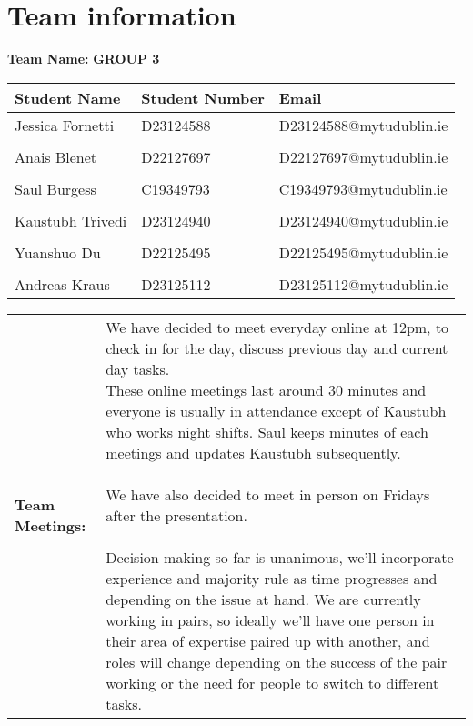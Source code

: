 \documentclass[a4paper,12pt]{article}
\begin{document}
\newpage
\section{Team information}
\textbf{Team Name:} \textbf{GROUP 3}
\vspace{0.2cm}
\begin{table}[h]
    \centering
    \begin{tabularx}{\textwidth}{@{}p{4cm} p{4cm} p{5cm}@{}}
        \toprule Student Name & Student Number & Email \\
        \midrule
            Jessica Fornetti & D23124588 & D23124588@mytudublin.ie \\ \\
            Anais Blenet & D22127697 & D22127697@mytudublin.ie \\ \\
            Saul Burgess & C19349793 & C19349793@mytudublin.ie \\ \\
            Kaustubh Trivedi & D23124940 & D23124940@mytudublin.ie \\ \\
            Yuanshuo Du & D22125495 & D22125495@mytudublin.ie \\ \\
            Andreas Kraus & D23125112 & D23125112@mytudublin.ie \\ 
        \bottomrule 
    \end{tabularx}
\end{table}

\begin{tabular}{|p{}|p{}|}
    \hline
    \textbf{Team Meetings:} & \parbox{0.65\textwidth}
    {\vspace{0.3cm}
    We have decided to meet everyday online at 12pm, to check in for the day, discuss previous day and current day tasks. \\ These online meetings last around 30 minutes and everyone is usually in attendance except of Kaustubh who works night shifts. Saul keeps minutes of each meetings and updates Kaustubh subsequently. \\ \\ We have also decided to meet in person on Fridays after the presentation. \\ \\ Decision-making so far is unanimous, we'll incorporate experience and majority rule as time progresses and depending on the issue at hand. We are currently working in pairs, so ideally we'll have one person in their area of expertise paired up with another, and roles will change depending on the success of the pair working or the need for people to switch to different tasks. \vspace{0.3cm}} \\
    \hline
\end{tabular}
\end{document}
